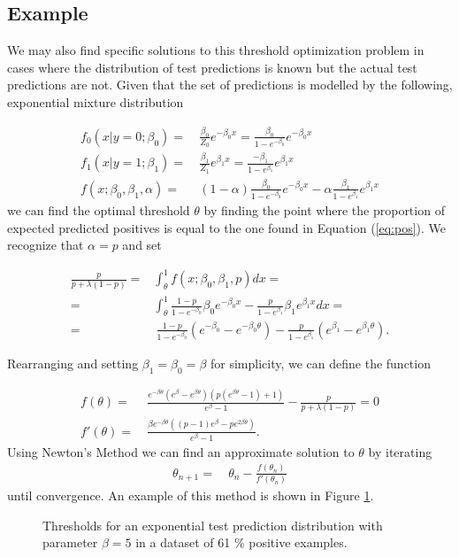 \documentclass{article}
\begin{document}

\subsection{Example}

We may also find specific solutions to this threshold optimization problem in cases where the distribution of test predictions is known but the actual test predictions are not.
Given that the set of predictions is modelled by the following, exponential mixture distribution

\begin{align*}
    f_0(x\vert y=0;\beta_0) =& \ \frac{\beta_0}{Z_0}e^{-\beta_0 x} = \frac{\beta_0}{1-e^{-\beta_0}}e^{-\beta_0 x} \\
    f_1(x\vert y=1;\beta_1) =& \ \frac{\beta_1}{Z_1}e^{\beta_1 x} = \frac{-\beta_1}{1-e^{\beta_1}}e^{\beta_1 x}\\
    f (x;\beta_0,\beta_1,\alpha) =& \ (1-\alpha)\frac{\beta_0}{1-e^{-\beta_0}}e^{-\beta_0 x} - \alpha\frac{\beta_1}{1-e^{\beta_1}}e^{\beta_1 x} %
\end{align*}
we can find the optimal threshold $\theta$ by finding the point where the proportion of expected predicted positives is equal to the one found in Equation (\ref{eq:pos}). We recognize that $\alpha = p$ and set

\begin{align}
    \frac{p}{p+\lambda(1-p)} = & \int_{\theta}^1 f(x;\beta_0, \beta_1, p) dx = \\
    = & \int_{\theta}^1 \frac{1-p}{1-e^{-\beta_0}}\beta_0e^{-\beta_0x} - \frac{p}{1-e^{\beta_1}}\beta_1e^{\beta_1x} dx = \\
    = & \ \frac{1-p}{1-e^{-\beta_0}}(e^{-\beta_0}-e^{-\beta_0 \theta}) - \frac{p}{1-e^{\beta_1}}(e^{\beta_1}-e^{\beta_1 \theta})\text{.}
\end{align}

Rearranging and setting $\beta_1 = \beta_0 = \beta$ for simplicity, we can define the function

\begin{align}
    f(\theta) =& \ \frac{e^{-\beta \theta} (e^\beta-e^{\beta \theta}) (p(e^{\beta \theta}-1) + 1)}{e^{\beta}-1} - \frac{p}{p+\lambda(1-p)} = 0 \\
    f'(\theta) =& \ \frac{\beta e^{-\beta \theta} ((p-1) e^\beta - p e^{2\beta \theta})}{e^{\beta}-1}\text{.}
\end{align}
Using Newton's Method we can find an approximate solution to $\theta$ by iterating
\begin{align}
    \theta_{n+1} =& \ \theta_n - \frac{f(\theta_n)}{f'(\theta_n)}
\end{align}
until convergence. An example of this method is shown in Figure \ref{fig:exp5}.
\begin{figure}
    \centering
    \scalebox{.8}{}
    \caption{Thresholds for an exponential test prediction distribution with parameter $\beta = 5$ in a dataset of 61 \% positive examples.}
    \label{fig:exp5}
\end{figure}
\end{document}
